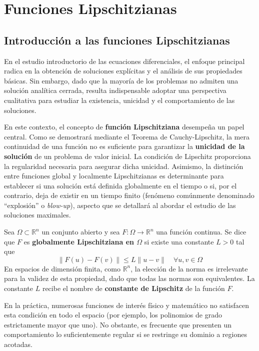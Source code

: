 ﻿\section{Funciones Lipschitzianas}

\subsection{Introducción a las funciones Lipschitzianas}
En el estudio introductorio de las ecuaciones diferenciales, el enfoque principal radica en la obtención de soluciones explícitas y el análisis de sus propiedades básicas. Sin embargo, dado que la mayoría de los problemas no admiten una solución analítica cerrada, resulta indispensable adoptar una perspectiva cualitativa para estudiar la existencia, unicidad y el comportamiento de las soluciones.

En este contexto, el concepto de \textbf{función Lipschitziana} desempeña un papel central. Como se demostrará mediante el Teorema de Cauchy-Lipschitz, la mera continuidad de una función no es suficiente para garantizar la \textbf{unicidad de la solución} de un problema de valor inicial. La condición de Lipschitz proporciona la regularidad necesaria para asegurar dicha unicidad. Asimismo, la distinción entre funciones global y localmente Lipschitzianas es determinante para establecer si una solución está definida globalmente en el tiempo o si, por el contrario, deja de existir en un tiempo finito (fenómeno comúnmente denominado ``explosión'' o \textit{blow-up}), aspecto que se detallará al abordar el estudio de las soluciones maximales.

\begin{definición}
    Sea $\Omega \subset \mathbb{R}^n$ un conjunto abierto y sea $F : \Omega \to \mathbb{R}^n$ una función continua. Se dice que $F$ es \textbf{globalmente Lipschitziana en $\Omega$} si existe una constante $L > 0$ tal que
    \[
        \| F(u) - F(v) \| \leq L \| u - v \| \quad \forall u, v \in \Omega
    \]
    En espacios de dimensión finita, como $\mathbb{R}^n$, la elección de la norma es irrelevante para la validez de esta propiedad, dado que todas las normas son equivalentes. La constante $L$ recibe el nombre de \textbf{constante de Lipschitz} de la función $F$.
\end{definición}

En la práctica, numerosas funciones de interés físico y matemático no satisfacen esta condición en todo el espacio (por ejemplo, los polinomios de grado estrictamente mayor que uno). No obstante, es frecuente que presenten un comportamiento lo suficientemente regular si se restringe su dominio a regiones acotadas.

